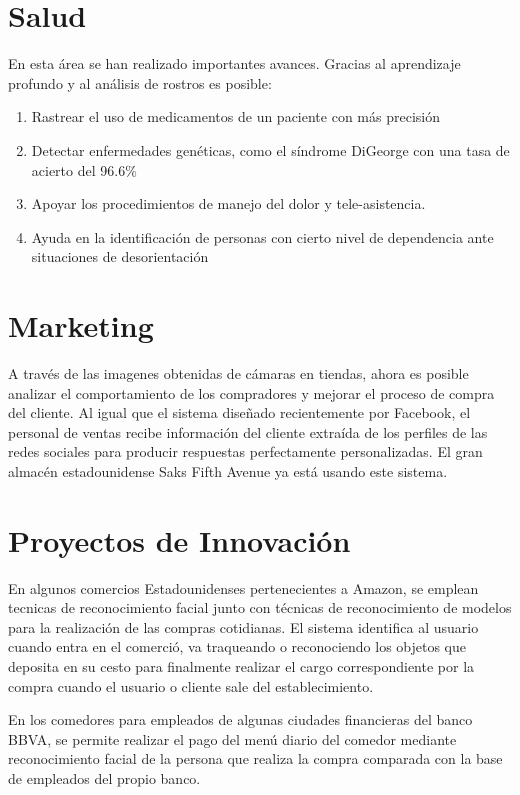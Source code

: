 \documentclass[a4paper,11pt]{book}
\begin{document}
\section{Salud}

En esta área se han realizado importantes avances. Gracias al aprendizaje profundo y al análisis de rostros es posible:
\begin{enumerate}
\item Rastrear el uso de medicamentos de un paciente con más precisión
\item Detectar enfermedades genéticas, como el síndrome DiGeorge con una tasa de acierto del 96.6\%
\item Apoyar los procedimientos de manejo del dolor y tele-asistencia. 
\item Ayuda en la identificación de personas con cierto nivel de dependencia ante situaciones de desorientación
\end{enumerate}

\section{Marketing}

A través de las imagenes obtenidas de cámaras en tiendas, ahora es posible analizar el comportamiento de los compradores y mejorar el proceso de compra del cliente. Al igual que el sistema diseñado recientemente por Facebook, el personal de ventas recibe información del cliente extraída de los perfiles de las redes sociales para producir respuestas perfectamente personalizadas. El gran almacén estadounidense Saks Fifth Avenue  ya está usando este sistema.

\section{Proyectos de Innovación}

En algunos comercios Estadounidenses pertenecientes a Amazon, se emplean tecnicas de reconocimiento facial junto con técnicas de reconocimiento de modelos para la realización de las compras cotidianas. El sistema identifica al usuario cuando entra en el comerció, va traqueando o reconociendo los objetos que deposita en su cesto para finalmente realizar el cargo correspondiente por la compra cuando el usuario o cliente sale del establecimiento. 

En los comedores para empleados de algunas ciudades financieras del banco BBVA, se permite realizar el pago del menú  diario del comedor mediante reconocimiento facial de la persona que realiza la compra comparada con la base de empleados del propio banco. 
\end{document}

